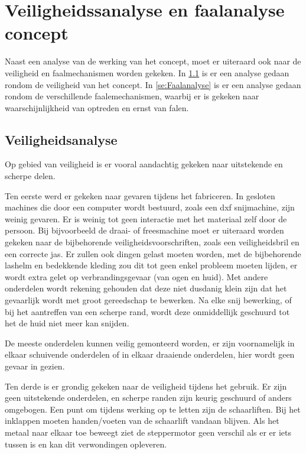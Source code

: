  \section{Veiligheidssanalyse en faalanalyse concept}
Naast een analyse van de werking van het concept, moet er uiteraard ook naar de veiligheid en faalmechanismen worden gekeken. In \cref{se:Veiligheidsanalyse} is er een analyse gedaan rondom de veiligheid van het concept. In \cref{se:Faalanalyse} is er een analyse gedaan rondom de verschillende faalemechanismen, waarbij er is gekeken naar waarschijnlijkheid van optreden en ernst van falen.

 \subsection{Veiligheidsanalyse}
 \label{se:Veiligheidsanalyse}
 Op gebied van veiligheid is er vooral aandachtig gekeken naar uitstekende en scherpe delen. 

Ten eerste werd er gekeken naar gevaren tijdens het fabriceren. In gesloten machines die door een computer wordt bestuurd, zoals een dxf snijmachine, zijn weinig gevaren. Er is weinig tot geen interactie met het materiaal zelf door de persoon. Bij bijvoorbeeld de draai- of freesmachine moet er uiteraard worden gekeken naar de bijbehorende veiligheidsvoorschriften, zoals een veiligheidsbril en een correcte jas. Er zullen ook dingen gelast moeten worden, met de bijbehorende lashelm en bedekkende kleding zou dit tot geen enkel probleem moeten lijden, er wordt extra gelet op verbrandingsgevaar (van ogen en huid). Met andere onderdelen wordt rekening gehouden dat deze niet dusdanig klein zijn dat het gevaarlijk wordt met groot gereedschap te bewerken. Na elke snij bewerking, of bij het aantreffen van een scherpe rand, wordt deze onmiddellijk geschuurd tot het de huid niet meer kan snijden.

De meeste onderdelen kunnen veilig gemonteerd worden, er zijn voornamelijk in elkaar schuivende onderdelen of in elkaar draaiende onderdelen, hier wordt geen gevaar in gezien.

Ten derde is er grondig gekeken naar de veiligheid tijdens het gebruik. Er zijn geen uitstekende onderdelen, en scherpe randen zijn keurig geschuurd of anders omgebogen. Een punt om tijdens werking op te letten zijn de schaarliften. Bij het inklappen moeten handen/voeten van de schaarlift vandaan blijven. Als het metaal naar elkaar toe beweegt ziet de steppermotor geen verschil als er er iets tussen is en kan dit verwondingen opleveren.


